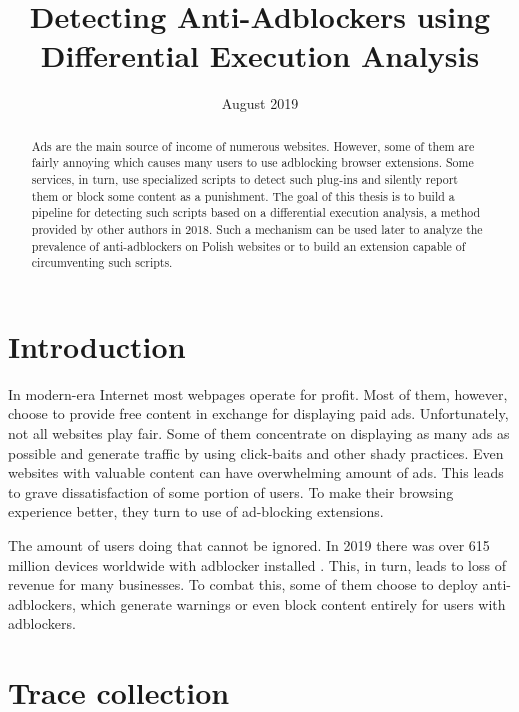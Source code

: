 \documentclass[en]{pracamgr}
\title{Detecting Anti-Adblockers using Differential Execution Analysis}
\date{August 2019}
\begin{document}
\maketitle

\begin{abstract}
Ads are the main source of income of numerous websites. 
However, some of them are fairly annoying which causes many users to use adblocking browser extensions. 
Some services, in turn, use specialized scripts to detect such plug-ins 
and silently report them or block some content as a punishment. 
The goal of this thesis is to build a pipeline for detecting such scripts based on a differential execution analysis, 
a method provided by other authors in 2018. 
Such a mechanism can be used later to analyze the prevalence of anti-adblockers 
on Polish websites or to build an extension capable of circumventing such scripts.

\end{abstract}

\tableofcontents

\chapter*{Introduction}

In modern-era Internet most webpages operate for profit. Most of them, however, choose to provide free content
in exchange for displaying paid ads. Unfortunately, not all websites play fair. Some of them
concentrate on displaying as many ads as possible and generate traffic by using click-baits 
and other shady practices. Even websites with valuable content can have overwhelming amount 
of ads. This leads to grave dissatisfaction of some portion of users. To make their browsing experience better,
they turn to use of ad-blocking extensions.

The amount of users doing that cannot be ignored. In 2019 there was over 615 million devices worldwide
with adblocker installed \cite{internet-facts}. This, in turn, leads to loss of revenue for many businesses.
To combat this, some of them choose to deploy anti-adblockers, which generate warnings 
or even block content entirely for users with adblockers.





\chapter{Trace collection}
\end{document}
